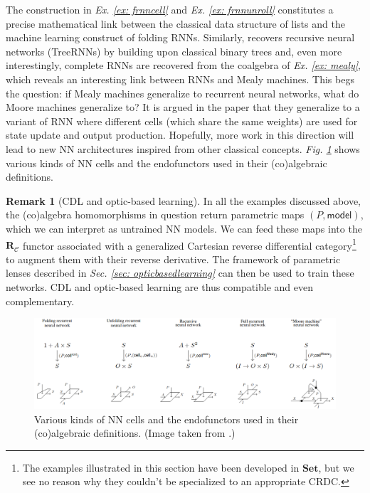 \documentclass[11pt,a4paper,openright,twoside]{report}
\newcounter{mycounter}
\theoremstyle{plain}
\theoremstyle{definition}
\newtheorem{remark}[mycounter]{Remark}
\begin{document}
The construction in  \textit{Ex. \ref{ex: frnncell}} and \textit{Ex. \ref{ex: frnnunroll}} constitutes a precise mathematical link between the classical data structure of lists and the machine learning construct of folding RNNs. Similarly, \cite{gavranovicposition} recovers recursive neural networks (TreeRNNs) by building upon classical binary trees and, even more interestingly, complete RNNs are recovered from the coalgebra of \textit{Ex. \ref{ex: mealy}}, which reveals an interesting link between RNNs and Mealy machines. This begs the question: if Mealy machines generalize to recurrent neural networks, what do Moore machines generalize to? It is argued in the paper that they generalize to a variant of RNN where different cells (which share the same weights) are used for state update and output production. Hopefully, more work in this direction will lead to new NN architectures inspired from other classical concepts. \textit{Fig. \ref{fig: cells}} shows various kinds of NN cells and the endofunctors used in their (co)algebraic definitions.

\begin{remark}[CDL and optic-based learning]
  In all the examples discussed above, the (co)algebra homomorphisms in question return parametric maps $(P,\mathsf{model})$, which we can interpret as untrained NN models. We can feed these maps into the $\mathbf{R}_{\mathcal{C}}$ functor associated with a generalized Cartesian reverse differential category\footnote{The examples illustrated in this section have been developed in $\mathbf{Set}$, but we see no reason why they couldn't be specialized to an appropriate CRDC.} to augment them with their reverse derivative. The framework of parametric lenses described in 
  \textit{Sec. \ref{sec: opticbasedlearning}} can then be used to train these networks. CDL and optic-based learning are thus compatible and even complementary.
\end{remark}

\begin{figure}[h]
  \begin{center}
    \includegraphics[width=\textwidth]{figures/cells.png}     
    \caption[Neural network cells]{Various kinds of NN cells and the endofunctors used in their (co)algebraic definitions. (Image taken from \cite{gavranovicposition}.)}
    \label{fig: cells}
  \end{center}
\end{figure}
\end{document}
